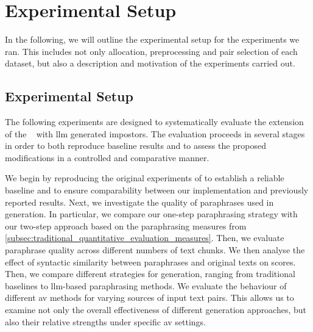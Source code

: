 \chapter{Experimental Setup}
\label{chap:experimental_setup}

In the following, we will outline the experimental setup for the experiments we ran.
This includes not only allocation, preprocessing and pair selection of each dataset, but also a description and motivation of the experiments carried out.






\section{Experimental Setup}
\label{sec:experimental_setup}

The following experiments are designed to systematically evaluate the extension of the \impAppr{}~\citep{koppel_determining_2014} with \ac{llm} generated impostors. 
The evaluation proceeds in several stages in order to both reproduce baseline results and to assess the proposed modifications in a controlled and comparative manner.

We begin by reproducing the original \impAppr{} experiments of \citet{koppel_determining_2014} to establish a reliable baseline and to ensure comparability between our implementation and previously reported results. 
Next, we investigate the quality of paraphrases used in \imp{} generation. 
In particular, we compare our one-step paraphrasing strategy with our two-step approach based on the paraphrasing measures from \autoref{subsec:traditional_quantitative_evaluation_measures}. 
Then, we evaluate paraphrase quality across different numbers of text chunks.
We then analyse the effect of syntactic similarity between paraphrases and original texts on \imp{} scores. 
Then, we compare different strategies for \imp{} generation, ranging from traditional baselines to \ac{llm}-based paraphrasing methods. 
We evaluate the behaviour of different \ac{av} methods for varying sources of input text pairs. 
This allows us to examine not only the overall effectiveness of different \imp{} generation approaches, but also their relative strengths under specific \ac{av} settings.


















